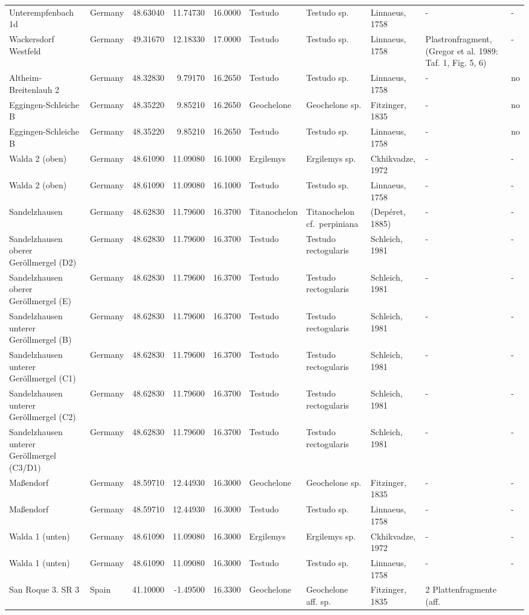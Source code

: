 \begin{landscape}
{\begin{longtable}[]{@{}llrrrlllll@{}}
Unterempfenbach 1d & Germany & 48.63040 & 11.74730 & 16.0000 & Testudo &
Testudo sp. & Linnaeus, 1758 & - & -\tabularnewline
Wackersdorf Westfeld & Germany & 49.31670 & 12.18330 & 17.0000 & Testudo
& Testudo sp. & Linnaeus, 1758 & Plastronfragment, (Gregor et al. 1989:
Taf. 1, Fig. 5, 6) & -\tabularnewline
Altheim-Breitenlauh 2 & Germany & 48.32830 & 9.79170 & 16.2650 & Testudo
& Testudo sp. & Linnaeus, 1758 & - & no\tabularnewline
Eggingen-Schleiche B & Germany & 48.35220 & 9.85210 & 16.2650 &
Geochelone & Geochelone sp. & Fitzinger, 1835 & - & no\tabularnewline
Eggingen-Schleiche B & Germany & 48.35220 & 9.85210 & 16.2650 & Testudo
& Testudo sp. & Linnaeus, 1758 & - & no\tabularnewline
Walda 2 (oben) & Germany & 48.61090 & 11.09080 & 16.1000 & Ergilemys &
Ergilemys sp. & Ckhikvadze, 1972 & - & -\tabularnewline
Walda 2 (oben) & Germany & 48.61090 & 11.09080 & 16.1000 & Testudo &
Testudo sp. & Linnaeus, 1758 & - & -\tabularnewline
Sandelzhausen & Germany & 48.62830 & 11.79600 & 16.3700 & Titanochelon &
Titanochelon cf.~perpiniana & (Depéret, 1885) & - & -\tabularnewline
Sandelzhausen oberer Geröllmergel (D2) & Germany & 48.62830 & 11.79600 &
16.3700 & Testudo & Testudo rectogularis & Schleich, 1981 & - &
-\tabularnewline
Sandelzhausen oberer Geröllmergel (E) & Germany & 48.62830 & 11.79600 &
16.3700 & Testudo & Testudo rectogularis & Schleich, 1981 & - &
-\tabularnewline
Sandelzhausen unterer Geröllmergel (B) & Germany & 48.62830 & 11.79600 &
16.3700 & Testudo & Testudo rectogularis & Schleich, 1981 & - &
-\tabularnewline
Sandelzhausen unterer Geröllmergel (C1) & Germany & 48.62830 & 11.79600
& 16.3700 & Testudo & Testudo rectogularis & Schleich, 1981 & - &
-\tabularnewline
Sandelzhausen unterer Geröllmergel (C2) & Germany & 48.62830 & 11.79600
& 16.3700 & Testudo & Testudo rectogularis & Schleich, 1981 & - &
-\tabularnewline
Sandelzhausen unterer Geröllmergel (C3/D1) & Germany & 48.62830 &
11.79600 & 16.3700 & Testudo & Testudo rectogularis & Schleich, 1981 & -
& -\tabularnewline
Maßendorf & Germany & 48.59710 & 12.44930 & 16.3000 & Geochelone &
Geochelone sp. & Fitzinger, 1835 & - & -\tabularnewline
Maßendorf & Germany & 48.59710 & 12.44930 & 16.3000 & Testudo & Testudo
sp. & Linnaeus, 1758 & - & -\tabularnewline
Walda 1 (unten) & Germany & 48.61090 & 11.09080 & 16.3000 & Ergilemys &
Ergilemys sp. & Ckhikvadze, 1972 & - & -\tabularnewline
Walda 1 (unten) & Germany & 48.61090 & 11.09080 & 16.3000 & Testudo &
Testudo sp. & Linnaeus, 1758 & - & -\tabularnewline
San Roque 3. SR 3 & Spain & 41.10000 & -1.49500 & 16.3300 & Geochelone &
Geochelone aff. sp. & Fitzinger, 1835 & 2 Plattenfragmente (aff.

\end{longtable}}
\end{landscape}
